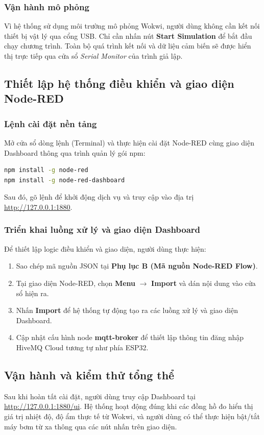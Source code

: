 \documentclass[12pt, a4paper]{article}
\newcommand{\code}[1]{\texttt{\detokenize{#1}}}
\begin{document}
\subsubsection{Vận hành mô phỏng}
Vì hệ thống sử dụng môi trường mô phỏng Wokwi, người dùng không cần kết nối thiết bị vật lý qua cổng USB. Chỉ cần nhấn nút \textbf{Start Simulation} để bắt đầu chạy chương trình. Toàn bộ quá trình kết nối và dữ liệu cảm biến sẽ được hiển thị trực tiếp qua cửa sổ \textit{Serial Monitor} của trình giả lập.

\subsection{Thiết lập hệ thống điều khiển và giao diện Node-RED}

\subsubsection{Lệnh cài đặt nền tảng}
Mở cửa sổ dòng lệnh (Terminal) và thực hiện cài đặt Node-RED cùng giao diện Dashboard thông qua trình quản lý gói npm:
\begin{lstlisting}[language=bash, basicstyle=\ttfamily\small, frame=none, numbers=none]
npm install -g node-red
npm install -g node-red-dashboard
\end{lstlisting}
Sau đó, gõ lệnh \code{node-red} để khởi động dịch vụ và truy cập vào địa trị \url{http://127.0.0.1:1880}.

\subsubsection{Triển khai luồng xử lý và giao diện Dashboard}
Để thiết lập logic điều khiển và giao diện, người dùng thực hiện:
\begin{enumerate}
    \item Sao chép mã nguồn JSON tại \textbf{Phụ lục B (Mã nguồn Node-RED Flow)}.
    \item Tại giao diện Node-RED, chọn \textbf{Menu} $\rightarrow$ \textbf{Import} và dán nội dung vào cửa sổ hiện ra.
    \item Nhấn \textbf{Import} để hệ thống tự động tạo ra các luồng xử lý và giao diện Dashboard.
    \item Cập nhật cấu hình node \textbf{mqtt-broker} để thiết lập thông tin đăng nhập HiveMQ Cloud tương tự như phía ESP32.
\end{enumerate}

\subsection{Vận hành và kiểm thử tổng thể}
Sau khi hoàn tất cài đặt, người dùng truy cập Dashboard tại \url{http://127.0.0.1:1880/ui}. Hệ thống hoạt động đúng khi các đồng hồ đo hiển thị giá trị nhiệt độ, độ ẩm thực tế từ Wokwi, và người dùng có thể thực hiện bật/tắt máy bơm từ xa thông qua các nút nhấn trên giao diện.
\end{document}
